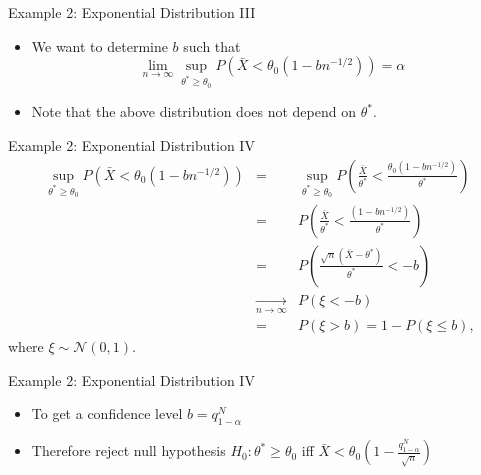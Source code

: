 \documentclass{beamer}
\begin{document}
\begin{frame}{Example 2: Exponential Distribution III} 
\begin{itemize} 
 \item We want to determine $b$ such that 
\begin{displaymath} 
 \lim_{n \rightarrow \infty} \sup_{\theta^* \geq \theta_0}P(\bar{X} < \theta_0(1 - bn^{-1/2})) = \alpha 
\end{displaymath}
\item Note that the above distribution does not depend on $\theta^*$. 
\end{itemize}
\end{frame}

\begin{frame}{Example 2: Exponential Distribution IV} 
\begin{eqnarray*} 
 \sup_{\theta^* \geq \theta_0} P(\bar{X} < \theta_0(1 - bn^{-1/2}))  &=& \sup_{\theta^* \geq \theta_0} P\left(\frac{\bar{X}}{\theta^*} < \frac{\theta_0(1 - bn^{-1/2})}{\theta^*}\right)  \\ 
&=& P\left(\frac{\bar{X}}{\theta^*} < \frac{(1 - bn^{-1/2})}{\theta^*}\right)  \\ 
&=& P\left(\frac{\sqrt{n}(\bar{X} - \theta^*)}{\theta^*} < - b\right)  \\ 
&\xrightarrow[n \rightarrow \infty]{} & P(\xi < -b) \\ 
&=& P(\xi > b) = 1 - P(\xi \leq b),
\end{eqnarray*}
where $\xi \sim \mathcal{N}(0, 1)$. 
\end{frame}

\begin{frame}{Example 2: Exponential Distribution IV} 
\begin{itemize} 
 \item To get a confidence level $b = q^N_{1-\alpha}$ 
\item Therefore reject null hypothesis $H_0: \theta^* \geq \theta_0$ iff $\bar{X} < \theta_0(1 - \frac{q_{1-\alpha}^N}{\sqrt{n}}) $
\end{itemize}

\end{frame}
\end{document}
